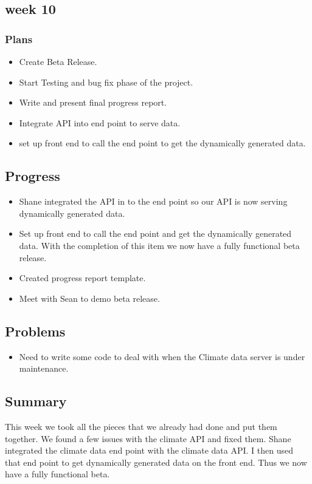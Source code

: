 \documentclass[onecolumn, draftclsnofoot,10pt, compsoc]{article}
\begin{document}
		\subsection{week 10}
			\subsubsection{Plans}
				\begin{itemize}
					\item Create Beta Release.
					\item Start Testing and bug fix phase of the project.
					\item Write and present final progress report.
					\item Integrate API into end point to serve data.
					\item set up front end to call the end point to get the dynamically generated data.
				\end{itemize}
			\subsection{Progress}
				\begin{itemize}
					\item Shane integrated the API in to the end point so our API is now serving dynamically generated data.
					\item Set up front end to call the end point and get the dynamically generated data. With the completion of this item we now have a fully functional beta release.
					\item Created progress report template.
					\item Meet with Sean to demo beta release.
				\end{itemize}
			\subsection{Problems}
				\begin{itemize}
					\item Need to write some code to deal with when the Climate data server is under maintenance.
				\end{itemize}
			\subsection{Summary} This week we took all the pieces that we already had done and put them together. We found a few issues with the climate API and fixed them. Shane integrated the climate data end point with the climate data API. I then used that end point to get dynamically generated data on the front end. Thus we now have a fully functional beta.\\
		
\end{document}
